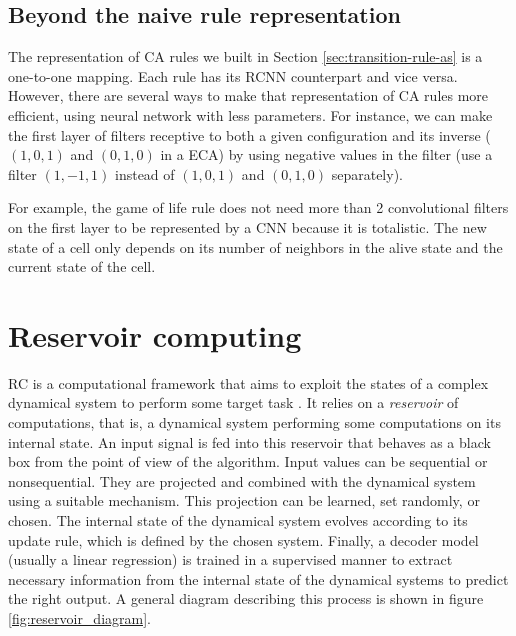 \subsection{Beyond the naive rule representation}

The representation of \ac{CA} rules we built in Section
\ref{sec:transition-rule-as} is a one-to-one mapping. Each rule has its
R\ac{CNN} counterpart and vice versa. However, there are several ways to make
that representation of \ac{CA} rules more efficient, using neural network with
less parameters. For instance, we can make the first layer of filters receptive
to both a given configuration and its inverse (\eg~$(1, 0, 1)$ and $(0, 1, 0)$
in a ECA) by using negative values in the filter (use a filter $(1, -1, 1)$
instead of $(1, 0, 1)$ and $(0, 1, 0)$ separately).

For example, the game of life rule does not need more than 2 convolutional
filters on the first layer to be represented by a \ac{CNN} because it is
totalistic. The new state of a cell only depends on its number of neighbors in
the alive state and the current state of the cell.


\section{Reservoir computing \label{sec:res-models}}
\Ac{RC} is a computational framework that aims to exploit the states of a
complex dynamical system to perform some target task
\parencite{tanakaRecentAdvancesPhysical2019}. It relies on a \emph{reservoir} of
computations, that is, a dynamical system performing some computations on its
internal state. An input signal is fed into this reservoir that behaves as a
black box from the point of view of the algorithm. Input values can be
sequential or nonsequential. They are projected and combined with the dynamical
system using a suitable mechanism. This projection can be learned, set randomly,
or chosen. The internal state of the dynamical system evolves according to its
update rule, which is defined by the chosen system. Finally, a decoder model
(usually a linear regression) is trained in a supervised manner to extract
necessary information from the internal state of the dynamical systems to
predict the right output. A general diagram describing this process is shown in
figure \ref{fig:reservoir_diagram}.

